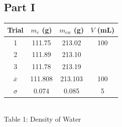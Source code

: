 \documentclass[12pt]{article}
\begin{document}
    \subsection*{Part I}
        \begin{center}
            \begin{tabular}{c|c|c|c}
                Trial & \(m_c\) (g) & \(m_{cw}\) (g) & \(V\) (mL)\\
                \hline
                1 & 111.75 & 213.02 & 100\\
                2 & 111.89 & 213.10 & \\
                3 & 111.78 & 213.19 & \\
                \hline
                \(\overline{x}\) & 111.808 & 213.103 & 100\\
                \(\sigma\) & 0.074 & 0.085 & 5
            \end{tabular}\\[6pt]
            Table 1: Density of Water\\[12pt]
        \end{center}
\end{document}
